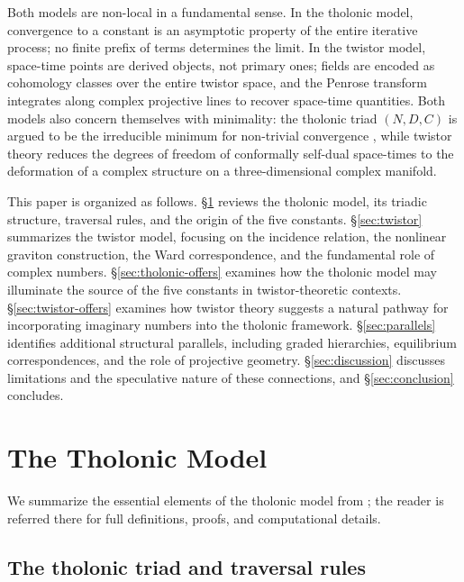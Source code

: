 \documentclass[12pt]{article}
\begin{document}
Both models are non-local in a fundamental sense.  In the tholonic model, convergence
to a constant is an asymptotic property of the entire iterative process; no finite
prefix of terms determines the limit.  In the twistor model, space-time points are
derived objects, not primary ones; fields are encoded as cohomology classes over the
entire twistor space, and the Penrose transform integrates along complex projective
lines to recover space-time quantities.  Both models also concern themselves with
minimality: the tholonic triad $(N, D, C)$ is argued to be the irreducible minimum
for non-trivial convergence \cite{Mil26b}, while twistor theory reduces the degrees
of freedom of conformally self-dual space-times to the deformation of a complex
structure on a three-dimensional complex manifold.

This paper is organized as follows.  \S\ref{sec:tholonic} reviews the tholonic model,
its triadic structure, traversal rules, and the origin of the five constants.
\S\ref{sec:twistor} summarizes the twistor model, focusing on the incidence relation,
the nonlinear graviton construction, the Ward correspondence, and the fundamental role
of complex numbers.  \S\ref{sec:tholonic-offers} examines how the tholonic model may
illuminate the source of the five constants in twistor-theoretic contexts.
\S\ref{sec:twistor-offers} examines how twistor theory suggests a natural pathway for
incorporating imaginary numbers into the tholonic framework.  \S\ref{sec:parallels}
identifies additional structural parallels, including graded hierarchies, equilibrium
correspondences, and the role of projective geometry.  \S\ref{sec:discussion} discusses
limitations and the speculative nature of these connections, and \S\ref{sec:conclusion}
concludes.

\section{The Tholonic Model}\label{sec:tholonic}

We summarize the essential elements of the tholonic model from \cite{Mil24}; the
reader is referred there for full definitions, proofs, and computational details.

\subsection{The tholonic triad and traversal rules}\label{sec:triad}
\end{document}
